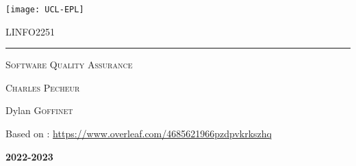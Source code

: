 \documentclass{customSynthesis}
\begin{document}

\begin{titlepage}
	\flushleft\texttt{[image: UCL-EPL]}\\
	\vspace*{2cm}
	\vspace*{\fill}
	\centering
	{\scshape\LARGE LINFO2251 \par}
	\vspace{0.4cm}
	{\color{clearBlue}\rule{0.7\textwidth}{1pt}\par}
	\vspace{0.5cm}
	{\scshape\Large Software Quality Assurance \par}
	\vspace{0.5cm}
	{\scshape\large Charles Pecheur\par}
	\vspace{1cm}
	{\scshape\large  \par} %
	{\Large\itshape\par}
	\vspace*{\fill}
	\vfill
	\vfill
	{\Large Dylan \textsc{Goffinet}\par}
	\vspace{0.2cm}
	{\small Based on : \url{https://www.overleaf.com/4685621966pzdpvkrkszhq}\par}
	\vspace{0.5cm}
	{\Large\bfseries 2022-2023\par}
	{\large \par}
\end{titlepage}


\tableofcontents{}
\setcounter{tocdepth}{1} %
\clearpage
\pagestyle{fancy}




\end{document}
